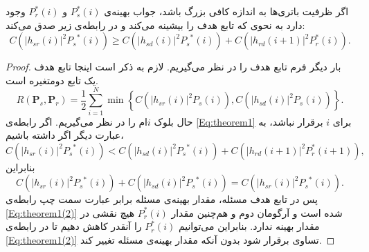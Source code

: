 \begin{theorem}
اگر ظرفیت باتری‌ها به اندازه کافی بزرگ باشد، جواب بهینه‌ی 
$P_s^*(i)$
و
$P_r^*(i)$
وجود دارد به نحوی که تابع هدف را بیشینه می‌کند و در رابطه‌ی زیر صدق می‌کند:
\begin{equation}
C\left( {{{\left| {{h_{sr}}\left( i \right)} \right|}^2}{P_s}^*\left( i \right)} \right) \ge C\left( {{{\left| {{h_{sd}}\left( i \right)} \right|}^2}{P_s}^*\left( i \right)} \right) + C\left( {{{\left| {{h_{rd}}\left( {i + 1} \right)} \right|}^2}P_r^*\left( {i} \right)} \right).
\label{Eq:theorem1}
\end{equation}

\begin{proof}
بار دیگر فرم تابع هدف را در نظر می‌گیریم. لازم به ذکر است اینجا تابع هدف یک تابع دومتغیره است.
\begin{equation}
{R({\mathbf{P}_s},{\mathbf{P}_r}) = {\frac{1}{2}\sum\limits_{i = 1}^N {\min } \left\{ {C\left( {{{\left| {{h_{sr}}\left( i \right)} \right|}^2}{P_s}\left( i \right)} \right),} C\left( {{{\left| {{h_{sd}}\left( i \right)} \right|}^2}{P_s}\left( i \right)} \right) \right\} }}.
\end{equation}
حال بلوک
$i$ام
را در نظر می‌گیریم. اگر رابطه‌ی
\ref{Eq:theorem1}
برای
$i$
برقرار نباشد، به عبارت دیگر اگر داشته باشیم،
\begin{equation}
C\left( {{{\left| {{h_{sr}}\left( i \right)} \right|}^2}{P_s}^*\left( i \right)} \right) < C\left( {{{\left| {{h_{sd}}\left( i \right)} \right|}^2}{P_s}^*\left( i \right)} \right) + C\left( {{{\left| {{h_{rd}}\left( {i + 1} \right)} \right|}^2}P_r^*\left( {i + 1} \right)} \right),
\label{Eq:theorem1(2)}
\end{equation}
بنابراین
\begin{equation}
C\left( {{{\left| {{h_{sr}}\left( i \right)} \right|}^2}{P_s}^*\left( i \right)} \right)+ C\left( {{{\left| {{h_{sd}}\left( i \right)} \right|}^2}{P_s}^*\left( i \right)} \right) =C\left( {{{\left| {{h_{sr}}\left( i \right)} \right|}^2}{P_s}^*\left( i \right)} \right).
\end{equation}
پس در تابع هدف مسئله، مقدار بهینه‌ی مسئله برابر عبارت سمت چپ رابطه‌ی
\ref{Eq:theorem1(2)}
شده است و آرگومان دوم و  هم‌چنین مقدار
$P_r^*(i)$
هیچ نقشی در مقدار بهینه ندارد. بنابراین می‌توانیم 
$P_r^*(i)$
را آنقدر کاهش دهیم تا در رابطه‌ی
\ref{Eq:theorem1(2)}
تساوی برقرار شود بدون آنکه مقدار بهینه‌ی مسئله تغییر کند.
\end{proof}
\label{theorem1}
\end{theorem}

